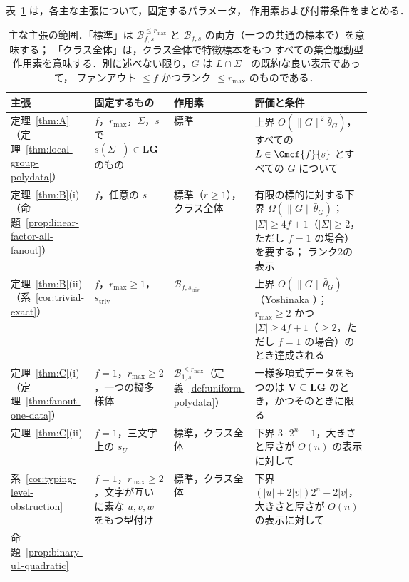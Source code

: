 表~\ref{tab:scope} は，各主な主張について，固定するパラメータ，
作用素および付帯条件をまとめる．

\begin{table}[htbp]
\caption{主な主張の範囲．「標準」は
$\mathcal B^{\le r_{\max}}_{f,s}$ と $\mathcal B_{f,s}$ の両方（一つの共通の標本で）を意味する；
「クラス全体」は，クラス全体で特徴標本をもつ
すべての集合駆動型作用素を意味する．別に述べない限り，$G$ は $L\cap\Sigma^+$ の既約な良い表示であって，
ファンアウト $\le f$ かつランク $\le r_{\max}$ のものである．}
\label{tab:scope}
\centering
\footnotesize
\setlength{\tabcolsep}{3pt}
\renewcommand{\arraystretch}{1.15}
\begin{tabularx}{\linewidth}{@{}>{\raggedright\arraybackslash}p{0.2\linewidth}>{\raggedright\arraybackslash}p{0.22\linewidth}>{\raggedright\arraybackslash}p{0.17\linewidth}>{\raggedright\arraybackslash}X@{}}
\hline
主張 & 固定するもの & 作用素 & 評価と条件\\
\hline
定理~\ref{thm:A}（定理~\ref{thm:local-group-polydata}）
 & $f$，$r_{\max}$，$\Sigma$，$s$ で $s(\Sigma^+)\in\mathbf{LG}$ のもの
 & 標準
 & 上界 $O(\|G\|^2\bar\theta_G)$，すべての $L\in\Cmcf{f}{s}$ とすべての $G$ について\\
定理~\ref{thm:B}(i)（命題~\ref{prop:linear-factor-all-fanout}）
 & $f$，任意の $s$
 & 標準（$r\ge1$），クラス全体
 & 有限の標的に対する下界 $\Omega(\|G\|\bar\theta_G)$；$|\Sigma|\ge4f+1$（$|\Sigma|\ge2$，ただし $f=1$ の場合）を要する；
   ランク2の表示\\
定理~\ref{thm:B}(ii)（系~\ref{cor:trivial-exact}）
 & $f$，$r_{\max}\ge1$，$s_{\mathrm{triv}}$
 & $\mathcal B_{f,s_{\mathrm{triv}}}$
 & 上界 $O(\|G\|\bar\theta_G)$（Yoshinaka \cite{Yoshinaka2011}）；$r_{\max}\ge2$ かつ $|\Sigma|\ge4f+1$（$\ge2$，ただし $f=1$ の場合）のとき達成される\\
定理~\ref{thm:C}(i)（定理~\ref{thm:fanout-one-data}）
 & $f=1$，$r_{\max}\ge2$，一つの擬多様体
 & $\mathcal B^{\le r_{\max}}_{1,s}$（定義~\ref{def:uniform-polydata}）
 & 一様多項式データをもつのは $\mathbf V\subseteq\mathbf{LG}$ のとき，かつそのときに限る\\
定理~\ref{thm:C}(ii)
  & $f=1$，三文字上の $s_U$
 & 標準，クラス全体
 & 下界 $3\cdot2^n-1$，大きさと厚さが $O(n)$ の表示に対して\\
系~\ref{cor:typing-level-obstruction}
 & $f=1$，$r_{\max}\ge2$，文字が互いに素な $u,v,w$ をもつ型付け
 & 標準，クラス全体
 & 下界 $(|u|+2|v|)2^n-2|v|$，大きさと厚さが $O(n)$ の表示に対して\\
命題~\ref{prop:binary-u1-quadratic}

\end{tabularx}
\end{table}
